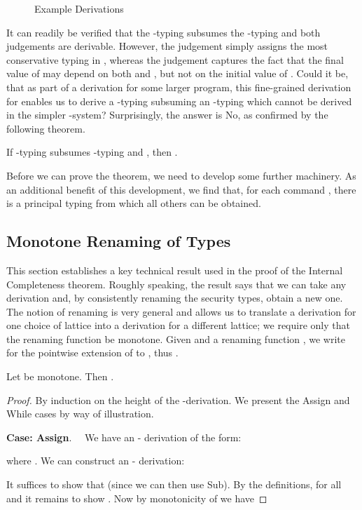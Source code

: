 \documentclass{sigplanconf}
\newcommand{\proofcase}[2][Case]{\noindent  
 \raisebox{2ex}{\mbox{}} \textbf{#1: #2}.~~}
\begin{document}
\begin{table}
\begin{figure*}
\begin{center}
\end{center}
\caption{Example Derivations}
\label{fig:diamond}
\end{figure*}
It can readily be verified that the -typing
subsumes the -typing and both
judgements are derivable.
However,
the  judgement simply assigns  the most conservative typing in ,
whereas
the  judgement captures the fact
that the final value of  may depend on both  and , but not on the initial value of .
Could it be, that as part of a derivation for some larger program,
this fine-grained derivation for 
enables us to derive
a -typing subsuming an -typing which cannot be derived in the simpler
-system?
Surprisingly, the answer is No, as confirmed by the following theorem.
\begin{theorem}\label{theorem:internalcompleteness}
        If -typing  subsumes
        -typing 
        and , then
    .
\end{theorem}
Before we can prove the theorem, we need to develop some further machinery.
As an additional benefit of this development, we find that,
for each command , there is a principal typing
from which all others can be obtained.

\subsection{Monotone Renaming of Types}
This section establishes a key technical result used in the proof of the Internal Completeness theorem.
Roughly speaking, the result says that we can take any derivation and, by consistently
renaming the security types, obtain a new one. The notion of renaming is very
general and allows us to translate a derivation for one choice
of lattice into a derivation for a different lattice;
we require only that the renaming function be monotone.
Given  and a renaming
function , we write 
for the pointwise extension of  to , thus
.

\begin{lemma}
Let  be monotone.
Then
.
\end{lemma}
\begin{proof}
By induction on the height of the -derivation.
We present the Assign and While cases by way of illustration.

\proofcase{Assign}
We have an - derivation of the form:

where .
We can construct an - derivation:

It suffices to show that 
(since we can then use Sub). By the definitions,  for all
 and it remains to show .
Now by monotonicity of  we have


\end{proof}
\end{table}
\end{document}
